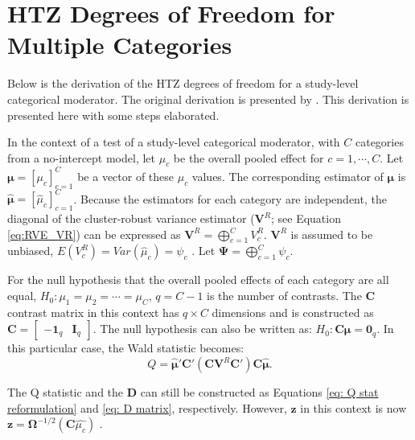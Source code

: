 
\chapter{HTZ Degrees of Freedom for Multiple Categories}\label{App: multiplecat}
\def\Pr{{\text{Pr}}}
\def\E{{\text{E}}}
\def\Var{{\text{Var}}}
\def\Cov{{\text{Cov}}}
\def\cor{{\text{cor}}}
\def\bm{\mathbf}
\def\bs{\boldsymbol}


Below is the derivation of the HTZ degrees of freedom for a study-level categorical moderator. The original derivation is presented by \textcite{pustejovsky2024}. This derivation is presented here with some steps elaborated. 

In the context of a test of a study-level categorical moderator, with $C$ categories from a no-intercept model, let $\mu_c$ be the overall pooled effect for $c=1,\cdots, C$. Let $\bm{\mu} = \left[\mu_c\right]_{c=1}^C$ be a vector of these $\mu_c$ values. The corresponding estimator of $\bm{\mu}$  is $\bm{\hat{\mu}} = \left[\hat{\mu}_c\right]_{c=1}^C$. Because the estimators for each category are independent, the diagonal of the cluster-robust variance estimator ($\bm{V}^R$; see Equation \ref{eq:RVE_VR}) can be expressed as $\bm{V}^R = \bigoplus_{c=1}^C V^R_c$.
$\bm{V}^R$ is assumed to be unbiased, $E(V_c^R) = Var(\hat{\mu}_c) = \psi_c$ \autocite{pustejovsky_wald_2025}. Let $\bs{\Psi} = \bigoplus_{c=1}^C \psi_c$.



For the null hypothesis that the overall pooled effects of each category are all equal,  $H_0: \mu_1 = \mu_2 = \cdots = \mu_C$,  $q=C-1$ is the number of contrasts. The $\mathbf{C}$ contrast matrix in this context has $q \times C$ dimensions and is constructed as $\mathbf{C} = \begin{bmatrix}
    -\mathbf{1}_q & \mathbf{I}_q
\end{bmatrix}$.  The null hypothesis can also be written as: $H_0:\mathbf{C}\bm{\mu} = \bm{0}_q$. In this particular case, the Wald statistic becomes:
\begin{equation}
    Q = \hat{\bm{\mu}}'\mathbf{C}'(\mathbf{C} \mathbf{V}^R \mathbf{C}') \mathbf{C}\hat{\bm{\mu}}.
    \nonumber
\end{equation}

The Q statistic and the $\mathbf{D}$ can still be constructed as Equations \ref{eq: Q stat reformulation} and \ref{eq: D matrix}, respectively. However, $\mathbf{z}$ in this context is now $\mathbf{z} = \mathbf{\Omega}^{-1/2}(\mathbf{C}\hat{\mu_c})$ \autocite{pustejovsky_wald_2025}.


